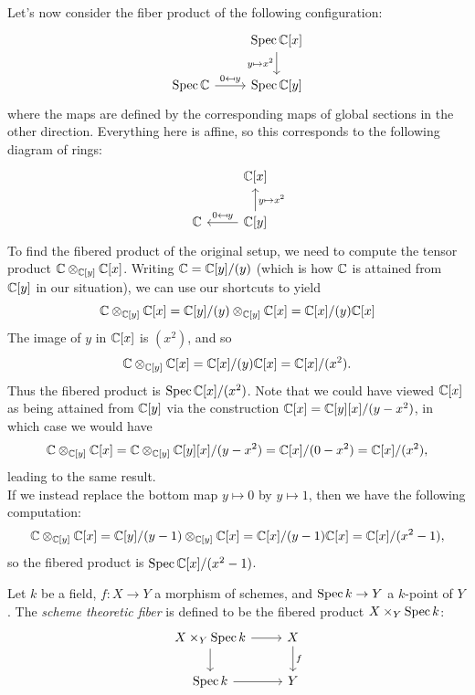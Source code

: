 \begin{example}
    Let's now consider the fiber product of the following configuration:
\[\begin{tikzcd}
	& {\Spec\C[x]} \\
	{\Spec\C} & {\Spec\C[y]}
	\arrow["{0\mapsfrom y}", from=2-1, to=2-2]
	\arrow["{y\mapsto x^2}"', from=1-2, to=2-2]
\end{tikzcd}\]
    where the maps are defined by the corresponding maps of global sections in the other direction. Everything here is affine, so this corresponds to the following diagram of rings:
\[\begin{tikzcd}
	& {\C[x]} \\
	\C & {\C[y]}
	\arrow["{y\mapsto x^2}"', from=2-2, to=1-2]
	\arrow["{0\mapsfrom y}"', from=2-2, to=2-1]
\end{tikzcd}\]
    To find the fibered product of the original setup, we need to compute the tensor product $\mathbb{C}\otimes_{\mathbb{C}[y]}\mathbb{C}[x]$. Writing $\mathbb{C}=\mathbb{C}[y]/(y)$ (which is how $\mathbb{C}$ is attained from $\mathbb{C}[y]$ in our situation), we can use our shortcuts to yield
    \[
    \mathbb{C}\otimes_{\mathbb{C}[y]}\mathbb{C}[x]=\mathbb{C}[y]/(y)\otimes_{\mathbb{C}[y]}\mathbb{C}[x]=\mathbb{C}[x]/(y)\mathbb{C}[x]
    \]
    The image of $y$ in $\mathbb{C}[x]$ is $(x^2)$, and so
    \[
    \mathbb{C}\otimes_{\mathbb{C}[y]}\mathbb{C}[x]=\mathbb{C}[x]/(y)\mathbb{C}[x]=\mathbb{C}[x]/(x^2).
    \]
    Thus the fibered product is $\operatorname{Spec}\mathbb{C}[x]/(x^2)$. Note that we could have viewed $\mathbb{C}[x]$ as being attained from $\mathbb{C}[y]$ via the construction $\mathbb{C}[x]=\mathbb{C}[y][x]/(y-x^2)$, in which case we would have
    \[
    \mathbb{C}\otimes_{\mathbb{C}[y]}\mathbb{C}[x]=\mathbb{C}\otimes_{\mathbb{C}[y]}\mathbb{C}[y][x]/(y-x^2)=\mathbb{C}[x]/(0-x^2)=\mathbb{C}[x]/(x^2),
    \]
    leading to the same result. \\
    If we instead replace the bottom map $y\mapsto 0$ by $y\mapsto 1$, then we have the following computation:
    \[
    \mathbb{C}\otimes_{\mathbb{C}[y]}\mathbb{C}[x]=\mathbb{C}[y]/(y-1)\otimes_{\mathbb{C}[y]}\mathbb{C}[x]=\mathbb{C}[x]/(y-1)\mathbb{C}[x]=\mathbb{C}[x]/(x^2-1),
    \]
    so the fibered product is $\operatorname{Spec}\mathbb{C}[x]/(x^2-1)$.
\end{example}
\begin{definition}
    Let $k$ be a field, $f:X\to Y$ a morphism of schemes, and $\operatorname{Spec} k\to Y$ a $k$-point of $Y$. The \textit{scheme theoretic fiber} is defined to be the fibered product $X\times_Y\operatorname{Spec}  k$:
\[\begin{tikzcd}
	{X\times_Y\Spec k} & X \\
	{\Spec k} & Y
	\arrow[from=1-1, to=1-2]
	\arrow[from=1-1, to=2-1]
	\arrow["f", from=1-2, to=2-2]
	\arrow[from=2-1, to=2-2]
\end{tikzcd}\]
\end{definition}
